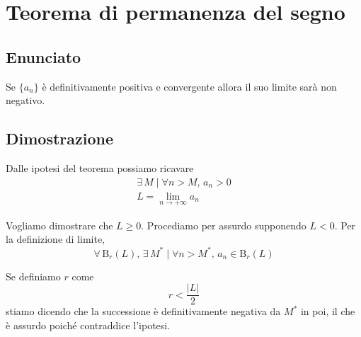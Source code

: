 \documentclass[../../analisi1]{subfiles}
\begin{document}
    \chapter{Teorema di permanenza del segno}
    \label{teoPermSegno}

        \section*{Enunciato}

            Se \(\{a_n\}\) è definitivamente positiva e convergente allora il suo limite sarà non negativo.

        \section*{Dimostrazione}

            Dalle ipotesi del teorema possiamo ricavare
            \begin{gather*}
                \exists \, M \; | \; \forall n > M, \, a_n > 0\\
                L = \lim_{n \to +\infty} a_n
            \end{gather*}

            Vogliamo dimostrare che \(L \geqslant 0\). Procediamo per assurdo supponendo \(L < 0\). Per la definizione
            di limite,
            \[
                \forall \, \mathrm{B}_r (L), \, \exists \, M^* \; | \; \forall n > M^*, \, a_n \in \mathrm{B}_r (L)
            \]

            Se definiamo \(r\) come
            \[
                r < \frac{|L|}{2}
            \]
            stiamo dicendo che la successione è definitivamente negativa da \(M^*\) in poi, il che è assurdo poiché
            contraddice l'ipotesi.
    
\end{document}
